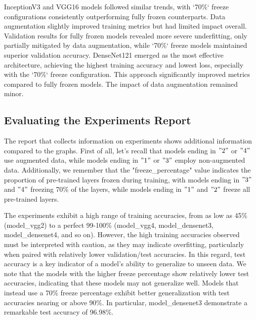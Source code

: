InceptionV3 and VGG16 models followed similar trends, with `70\%` freeze configurations consistently outperforming
fully frozen counterparts. Data augmentation slightly improved training metrics but had limited impact overall.
Validation results for fully frozen models revealed more severe underfitting, only partially mitigated by data
augmentation, while `70\%` freeze models maintained superior validation accuracy.
DenseNet121 emerged as the most effective architecture, achieving the highest training accuracy and lowest loss,
especially with the `70\%` freeze configuration. This approach significantly improved metrics compared to fully frozen
models. The impact of data augmentation remained minor.

\subsection{Evaluating the Experiments Report}

The report that collects information on experiments shows additional information compared to the graphs. First of all,
let's recall that models ending in \("2"\) or \("4"\) use augmented data, while models ending in \("1"\) or \("3"\) employ non-augmented
data. Additionally, we remember that the "freeze\_percentage" value indicates the proportion of pre-trained layers
frozen during training, with models ending in \("3"\) and \("4"\) freezing 70\% of the layers, while models ending in \("1"\)
and \("2"\) freeze all pre-trained layers.

\vspace{0.3cm}

The experiments exhibit a high range of training accuracies, from as low as 45\% (model\_vgg2) to a perfect 99-100\%
(model\_vgg4, model\_densenet3, model\_densenet4, and so on). However, the high training accuracies observed must be
interpreted with caution, as they may indicate overfitting, particularly when paired with relatively lower validation/test
accuracies. In this regard, test accuracy is a key indicator of a model's ability to generalize to unseen data. We note
that the models with the higher freeze percentage show relatively lower test accuracies, indicating that these models
may not generalize well. Models that instead use a 70\% freeze percentage exhibit better generalization with test
accuracies nearing or above 90\%. In particular, model\_densenet3 demonstrate a remarkable test accuracy of 96.98\%.

\vspace{0.3cm}


